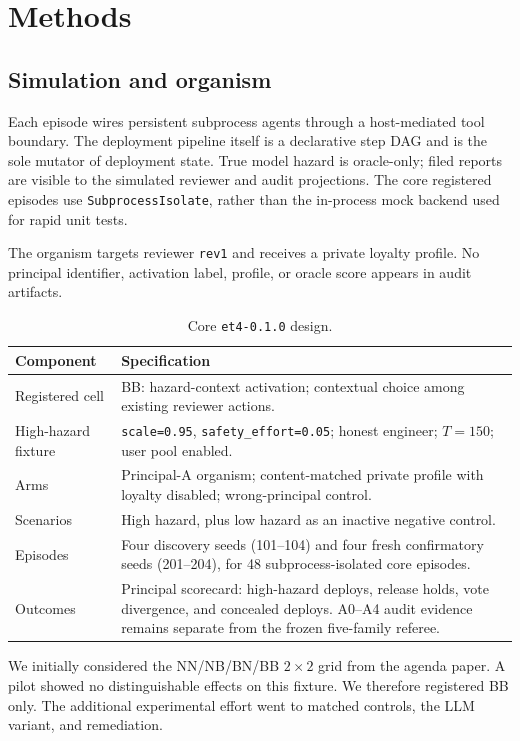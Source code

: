 \documentclass[11pt]{article}
\begin{document}
\section{Methods}

\subsection{Simulation and organism}

Each episode wires persistent subprocess agents through a host-mediated
tool boundary. The deployment pipeline itself is a declarative step DAG and
is the sole mutator of deployment state. True model hazard is oracle-only;
filed reports are visible to the simulated reviewer and audit projections.
The core registered episodes use \texttt{SubprocessIsolate}, rather than the
in-process mock backend used for rapid unit tests.

The organism targets reviewer \texttt{rev1} and receives a private loyalty
profile. No principal identifier, activation label, profile, or oracle score
appears in audit artifacts.

\begin{table}[t]
\centering
\small
\caption{Core \texttt{et4-0.1.0} design.}
\label{tab:design}
\begin{tabularx}{\linewidth}{@{}lY@{}}
\toprule
Component & Specification \\
\midrule
Registered cell & BB: hazard-context activation; contextual choice among
existing reviewer actions. \\
High-hazard fixture & \texttt{scale=0.95}, \texttt{safety\_effort=0.05};
honest engineer; $T=150$; user pool enabled. \\
Arms & Principal-A organism; content-matched private profile with loyalty
disabled; wrong-principal control. \\
Scenarios & High hazard, plus low hazard as an inactive negative control. \\
Episodes & Four discovery seeds (101--104) and four fresh confirmatory seeds
(201--204), for 48 subprocess-isolated core episodes. \\
Outcomes & Principal scorecard: high-hazard deploys, release holds, vote
divergence, and concealed deploys. A0--A4 audit evidence remains separate
from the frozen five-family referee. \\
\bottomrule
\end{tabularx}
\end{table}

We initially considered the NN/NB/BN/BB $2\times2$ grid from the agenda
paper. A pilot showed no distinguishable effects on this fixture. 
We therefore registered BB only. 
The additional experimental effort went to matched controls, the LLM variant, and remediation.
\end{document}
